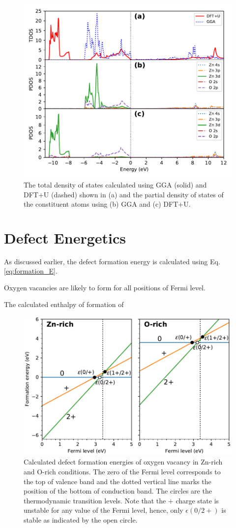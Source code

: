 	\begin{figure}[tbh!]
		\centering
		\includegraphics[width=0.7\linewidth]{"images/rnd/dos-pdos_juxtapose"}
		\caption[The total density of states calculated using GGA (solid) and DFT+U (dashed) shown in (a) and the partial density of states of the constituent atoms using (b) GGA and (c) DFT+U]{ The total density of states calculated using GGA (solid) and DFT+U (dashed) shown in (a) and the partial density of states of the constituent atoms using (b) GGA and (c) DFT+U.}
		\label{fig:hubbard_pdos}
	\end{figure}

\clearpage

\section{Defect Energetics}
As discussed earlier, the defect formation energy is calculated using Eq.  \eqref{eq:formation_E}. 


Oxygen vacancies are likely to form for all positions of Fermi level. 

The calculated enthalpy of formation of 
\begin{figure}[tbh!]
	\centering
	\includegraphics[width=0.65\linewidth]{"images/rnd/O_vac-formation"}
	\caption[Calculated defect formation energies of oxygen vacancy in Zn-rich and O-rich conditions]{Calculated defect formation energies of oxygen vacancy in Zn-rich and O-rich conditions. The zero of the Fermi level corresponds to the top of valence band and the dotted vertical line marks the position of the bottom of conduction band. The circles are the thermodynamic transition levels. Note that the $+$ charge state is unstable for any value of the Fermi level, hence, only $\epsilon(0/2+)$ is stable as indicated by the open circle. }
\end{figure}

